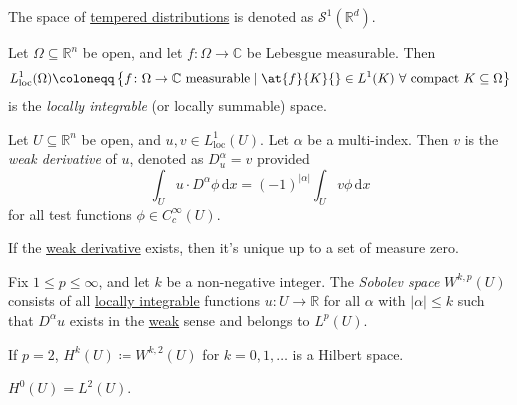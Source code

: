 \begin{notation}
	The space of \hyperref[def:tempered-distribution]{tempered distributions} is denoted as \(\mathcal{S} ^1(\mathbb{R} ^d)\).
\end{notation}

\begin{definition}\label{def:locally-integrable}
	Let \(\Omega \subseteq \mathbb{R} ^n\) be open, and let \(f\colon \Omega \to \mathbb{C} \) be Lebesgue measurable. Then
	\[
		L^1_{\text{loc} }(\Omega ) \coloneqq \left\{ f\colon \Omega \to \mathbb{C} \text{ measurable} \mid \at{f}{K}{} \in L^1(K)\ \forall \text{ compact } K \subseteq \Omega \right\}
	\]
	is the \emph{locally integrable} (or locally summable) space.
\end{definition}

\begin{definition}\label{def:weak-derivative}
	Let \(U \subseteq \mathbb{R} ^n\) be open, and \(u, v\in L^1_{\text{loc} }(U)\). Let \(\alpha\) be a multi-index. Then \(v\) is the \emph{weak derivative} of \(u\), denoted as \(D^\alpha _u = v\) provided
	\[
		\int _U u\cdot D^\alpha \phi \,\mathrm{d} x = (-1)^{\vert \alpha \vert} \int _U v \phi \,\mathrm{d} x
	\]
	for all test functions \(\phi \in C^{\infty} _c(U)\).
\end{definition}

\begin{remark}
	If the \hyperref[def:weak-derivative]{weak derivative} exists, then it's unique up to a set of measure zero.
\end{remark}

\begin{definition}\label{def:Sobolev-space}
	Fix \(1 \leq p \leq \infty \), and let \(k\) be a non-negative integer. The \emph{Sobolev space} \(W^{k, p}(U)\) consists of all \hyperref[def:locally-integrable]{locally integrable} functions \(u\colon U \to \mathbb{R} \) for all \(\alpha \) with \(\vert \alpha \vert \leq k\) such that \(D^\alpha u\) exists in the \hyperref[def:weak-derivative]{weak} sense and belongs to \(L^p(U)\).
\end{definition}

\begin{remark}
	If \(p = 2\), \(H^k(U) \coloneqq W^{k, 2}(U)\) for \(k = 0, 1, \dots \) is a Hilbert space.
\end{remark}

\begin{eg}
	\(H^0(U) = L^2(U)\).
\end{eg}

